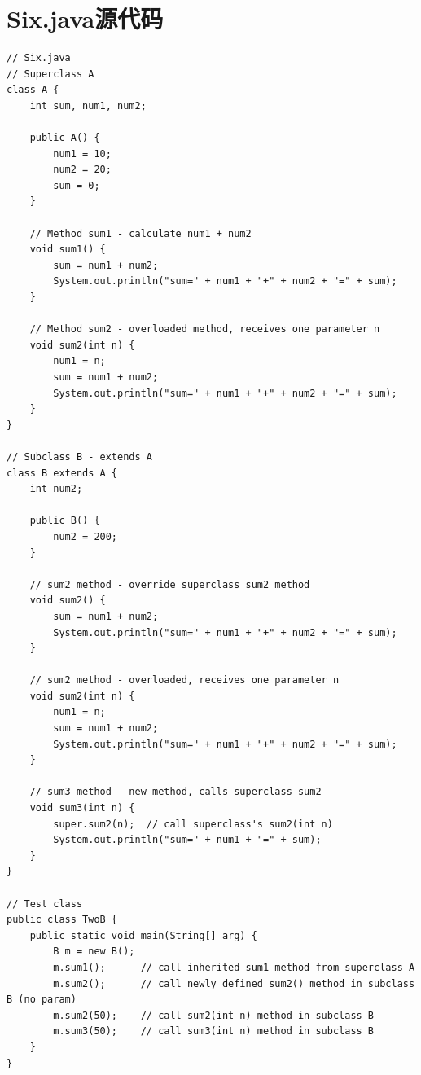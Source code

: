 \documentclass[12pt,a4paper]{article}
\begin{document}
\section*{Six.java源代码}\label{sec:six}
\begin{lstlisting}
// Six.java
// Superclass A
class A {
    int sum, num1, num2;
    
    public A() {
        num1 = 10;
        num2 = 20;
        sum = 0;
    }
    
    // Method sum1 - calculate num1 + num2
    void sum1() {
        sum = num1 + num2;
        System.out.println("sum=" + num1 + "+" + num2 + "=" + sum);
    }
    
    // Method sum2 - overloaded method, receives one parameter n
    void sum2(int n) {
        num1 = n;
        sum = num1 + num2;
        System.out.println("sum=" + num1 + "+" + num2 + "=" + sum);
    }
}

// Subclass B - extends A
class B extends A {
    int num2;  
    
    public B() {
        num2 = 200; 
    }
    
    // sum2 method - override superclass sum2 method
    void sum2() {
        sum = num1 + num2;
        System.out.println("sum=" + num1 + "+" + num2 + "=" + sum);
    }
    
    // sum2 method - overloaded, receives one parameter n
    void sum2(int n) {
        num1 = n;
        sum = num1 + num2;
        System.out.println("sum=" + num1 + "+" + num2 + "=" + sum);
    }
    
    // sum3 method - new method, calls superclass sum2
    void sum3(int n) {
        super.sum2(n);  // call superclass's sum2(int n)
        System.out.println("sum=" + num1 + "=" + sum);
    }
}

// Test class
public class TwoB {
    public static void main(String[] arg) {
        B m = new B();
        m.sum1();      // call inherited sum1 method from superclass A
        m.sum2();      // call newly defined sum2() method in subclass B (no param)
        m.sum2(50);    // call sum2(int n) method in subclass B
        m.sum3(50);    // call sum3(int n) method in subclass B
    }
}


\end{lstlisting}
\end{document}
